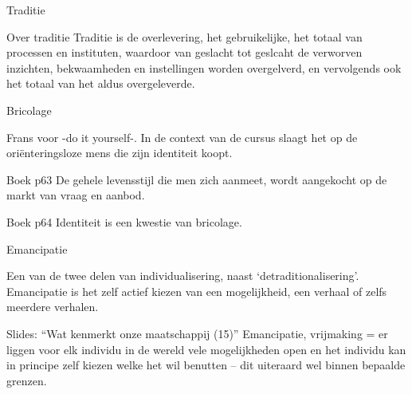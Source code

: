 \documentclass[main.tex]{subfiles}
\begin{document}
\begin{examenvraag}
    \begin{vraag}
        Traditie
    \end{vraag}

    \begin{antwoord}
    
    \begin{citaat}{Over traditie}
    Traditie is de overlevering, het gebruikelijke, het totaal van processen en 
    instituten, waardoor van geslacht tot geslcaht de verworven inzichten,
    bekwaamheden en instellingen worden overgelverd, en vervolgends ook het totaal 
    van het aldus overgeleverde.
    \end{citaat}
    \end{antwoord}
\end{examenvraag}

\begin{examenvraag}
    \begin{vraag}
        Bricolage
    \end{vraag}

    \begin{antwoord}
		Frans voor -do it yourself-. In de context van de cursus slaagt het op de ori\"{e}nteringsloze mens die zijn identiteit koopt. 
		  \begin{citaat}{Boek p63}
		De gehele levensstijl die men zich aanmeet, wordt aangekocht op de markt van vraag en aanbod.
        \end{citaat}
       \begin{citaat}{Boek p64}
		Identiteit is een kwestie van bricolage.
        \end{citaat}
    \end{antwoord}
   
\end{examenvraag}

\begin{examenvraag}
    \begin{vraag}
        Emancipatie
    \end{vraag}

    \begin{antwoord}
   		Een van de twee delen van individualisering, naast `detraditionalisering'. Emancipatie is het zelf actief kiezen van een mogelijkheid, een verhaal of zelfs meerdere verhalen.
   		\begin{citaat}{Slides: ``Wat kenmerkt onze maatschappij (15)''}
   		            Emancipatie, vrijmaking = er liggen voor elk individu in de wereld vele mogelijkheden open en het individu kan in principe zelf kiezen welke het wil benutten – dit uiteraard wel binnen bepaalde grenzen.
 		\end{citaat}
    \end{antwoord}
\end{examenvraag}
\end{document}
